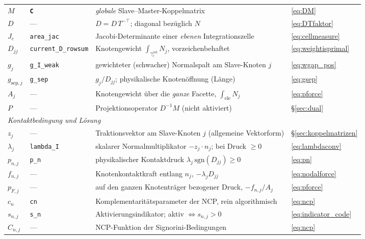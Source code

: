 \documentclass[a4paper,11pt]{article}
\def\bm#1{#1}%
\def\tilde#1{#1}%
\newcommand{\code}[1]{\texttt{\small #1}}
\begin{document}
\begin{center}
\begin{tabularx}{\linewidth}{llXl}
$\bm M$ & \textbf{\code{C}} & \emph{globale} Slave--Master-Koppelmatrix & \eqref{eq:DM} \\
$\tilde{\bm D}$ & --- & $\bm D=\tilde{\bm D}\,\bm T^{-\top}$; diagonal bezüglich $\tilde{\bm N}$ & \eqref{eq:DTfaktor} \\
$J_c$ & \code{area\_jac} & Jacobi-Determinante einer \emph{ebenen} Integrationszelle & \eqref{eq:cellmeasure} \\
$\tilde D_{jj}$ & \code{current\_D\_rowsum} & Knotengewicht $\int_{\gamma_c^{\text{ovl}}}\tilde N_j$, vorzeichenbehaftet & \eqref{eq:weightisprimal} \\
$\tilde g_j$ & \code{g\_I\_weak} & gewichteter (schwacher) Normalspalt am Slave-Knoten $j$ & \eqref{eq:wgap_pos} \\
$g_{\text{sep},j}$ & \code{g\_sep} & $\tilde g_j/\tilde D_{jj}$; physikalische Knotenöffnung (Länge) & \eqref{eq:gsep} \\
$A_j$ & --- & Knotengewicht über die \emph{ganze} Facette, $\int_{\text{ele}}\tilde N_j$ & \eqref{eq:pforce} \\
$\bm P$ & --- & Projektionsoperator $\bm D^{-1}\bm M$ (nicht aktiviert) & \S\ref{sec:dual} \\
\midrule
\multicolumn{4}{l}{\emph{Kontaktbedingung und Lösung}}\\
$\bm z_j$ & --- & Traktionsvektor am Slave-Knoten $j$ (allgemeine Vektorform) & \S\ref{sec:koppelmatrizen} \\
$\lambda_j$ & \code{lambda\_I} & skalarer Normalmultiplikator $-\bm z_j\!\cdot\!\bm n_j$; bei Druck $\ge0$ & \eqref{eq:lambdaconv} \\
$p_{n,j}$ & \code{p\_n} & physikalischer Kontaktdruck $\lambda_j\,\mathrm{sgn}(\tilde D_{jj})\ge0$ & \eqref{eq:pn} \\
$f_{n,j}$ & --- & Knotenkontaktkraft entlang $\bm n_j$, $-\lambda_j\tilde D_{jj}$ & \eqref{eq:nodalforce} \\
$p_{F,j}$ & --- & auf den ganzen Knotenträger bezogener Druck, $-f_{n,j}/A_j$ & \eqref{eq:pforce} \\
$c_n$ & \code{cn} & Komplementaritätsparameter der NCP, rein algorithmisch & \eqref{eq:ncp} \\
$s_{n,j}$ & \code{s\_n} & Aktivierungsindikator; aktiv $\iff s_{n,j}>0$ & \eqref{eq:indicator_code} \\
$C_{n,j}$ & --- & NCP-Funktion der Signorini-Bedingungen & \eqref{eq:ncp} \\
\bottomrule
\end{tabularx}
\end{center}
\end{document}
